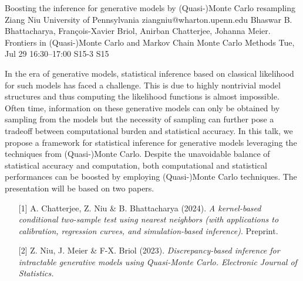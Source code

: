 \begin{talk}
  {Boosting the inference for generative models by (Quasi-)Monte Carlo resampling}%
  {Ziang Niu}%
  {University of Pennsylvania}%
  {ziangniu@wharton.upenn.edu}%
  {Bhaswar B. Bhattacharya, François-Xavier Briol, Anirban Chatterjee, Johanna Meier.}%
  {Frontiers in (Quasi-)Monte Carlo and Markov Chain Monte Carlo Methods}%
  {Tue, Jul 29 16:30–17:00}%
  {S15-3}%
  {S15}%
				
			
In the era of generative models, statistical inference based on classical likelihood for such models has faced a challenge. This is due to highly nontrivial model structures and thus computing the likelihood functions is almost impossible. Often time, information on these generative models can only be obtained by sampling from the models but the necessity of sampling can further pose a tradeoff between computational burden and statistical accuracy. In this talk, we propose a framework for statistical inference for generative models leveraging the techniques from (Quasi-)Monte Carlo. Despite the unavoidable balance of statistical accuracy and computation, both computational and statistical performances can be boosted by employing (Quasi-)Monte Carlo techniques. The presentation will be based on two papers.

\begin{enumerate}
	\item[{[1]}] A. Chatterjee, Z. Niu \& B. Bhattacharya (2024). {\it A kernel-based conditional two-sample test using nearest neighbors (with applications to calibration, regression curves, and simulation-based inference)}. Preprint.
	\item[{[2]}] Z. Niu, J. Meier \& F-X. Briol (2023). \it{Discrepancy-based inference for
  intractable generative models using
  Quasi-Monte Carlo.} Electronic Journal of Statistics.
\end{enumerate}

\medskip

\end{talk}

